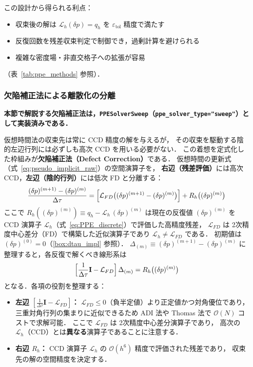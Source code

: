 この設計から得られる利点：

\begin{itemize}
  \item 収束後の解は $\mathcal{L}_h(\delta p) = q_h$ を $\varepsilon_\text{tol}$ 精度で満たす
  \item 反復回数を残差収束判定で制御でき，過剰計算を避けられる
  \item 複雑な密度場・非直交格子への拡張が容易
\end{itemize}

（表~\ref{tab:ppe_methods} 参照）．

\subsubsection{欠陥補正法による離散化の分離}
\label{sec:defect_correction}

\noindent\textbf{本節で解説する欠陥補正法は，\texttt{PPESolverSweep}（\texttt{ppe\_solver\_type="sweep"}）として実装済みである．}

仮想時間法の収束先は常に CCD 精度の解を与えるが，
その収束を駆動する陰的左辺行列には必ずしも高次 CCD を用いる必要がない．
この着想を定式化した枠組みが\textbf{欠陥補正法（Defect Correction）}である．
仮想時間の更新式（式~\eqref{eq:pseudo_implicit_raw}）の空間演算子を，
\textbf{右辺（残差評価）}には高次 CCD，\textbf{左辺（陰的行列）}には低次 FD と分離する：
\begin{equation}
  \frac{(\delta p)^{(m+1)}-(\delta p)^{(m)}}{\Delta\tau}
  = \Bigl[\mathcal{L}_{FD}\bigl((\delta p)^{(m+1)}-(\delta p)^{(m)}\bigr)\Bigr]
    + R_h\bigl((\delta p)^{(m)}\bigr)
  \label{eq:defect_correction_split}
\end{equation}
ここで $R_h((\delta p)^{(m)}) \equiv q_h - \mathcal{L}_h\,(\delta p)^{(m)}$ は現在の反復値 $(\delta p)^{(m)}$
を CCD 演算子 $\mathcal{L}_h$（式~\eqref{eq:PPE_discrete}）で評価した高精度残差，
$\mathcal{L}_{FD}$ は 2次精度中心差分（FD）で構築した近似演算子であり $\mathcal{L}_h \neq \mathcal{L}_{FD}$ である．
初期値は $(\delta p)^{(0)} = 0$（\ref{box:dtau_impl} 参照）．
$\Delta_{(m)} \equiv (\delta p)^{(m+1)}-(\delta p)^{(m)}$ に整理すると，各反復で解くべき線形系は
\begin{equation}
  \Bigl[\frac{1}{\Delta\tau}\mathbf{I} - \mathcal{L}_{FD}\Bigr]\,\Delta_{(m)}
  = R_h\bigl((\delta p)^{(m)}\bigr)
  \label{eq:defect_correction_linear}
\end{equation}
となる．各項の役割を整理する：
\begin{itemize}
  \item \textbf{左辺 $[\frac{1}{\Delta\tau}\mathbf{I} - \mathcal{L}_{FD}]$：}
        $\mathcal{L}_{FD} \le 0$（負半定値）より正定値かつ対角優位であり，
        三重対角行列の集まりに近似できるため ADI 法や
        Thomas 法で $\mathcal{O}(N)$ コストで求解可能．
        ここで $\mathcal{L}_{FD}$ は 2次精度中心差分演算子であり，
        高次の $\mathcal{L}_h$（CCD）とは\textbf{異なる}演算子であることに注意する．
  \item \textbf{右辺 $R_h$：} CCD 演算子 $\mathcal{L}_h$ の $\mathcal{O}(h^6)$ 精度で評価された残差であり，
        収束先の解の空間精度を決定する．
\end{itemize}

